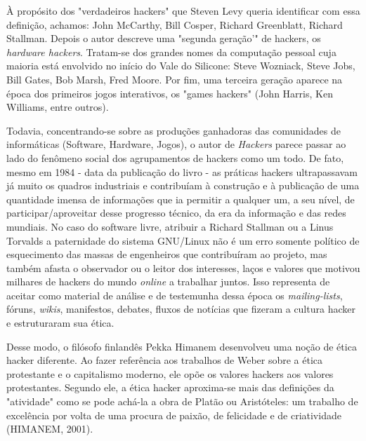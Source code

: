 À propósito dos "verdadeiros hackers" que Steven Levy queria identificar com essa definição, achamos: John McCarthy, Bill Cosper, Richard Greenblatt, Richard Stallman. Depois o autor descreve uma "segunda geração’" de hackers, os \emph{hardware hackers}.  Tratam-se dos grandes nomes da computação pessoal cuja maioria está envolvido no início do Vale do Silicone: Steve Wozniack, Steve Jobs, Bill Gates, Bob Marsh, Fred Moore. Por fim, uma terceira geração aparece na época dos primeiros jogos interativos, os "games hackers" (John Harris, Ken Williams, entre outros).

Todavia, concentrando-se sobre as produções ganhadoras das comunidades de informáticas (Software, Hardware, Jogos), o autor de \emph{Hackers} parece passar ao lado do fenômeno social dos agrupamentos de hackers como um todo. De fato, mesmo em 1984 - data da publicação do livro - as práticas hackers ultrapassavam já muito os quadros industriais e contribuíam à construção e à publicação de uma quantidade imensa de informações que ia permitir a qualquer um, a seu nível, de participar/aproveitar desse progresso técnico, da era da informação e das redes mundiais. No caso do software livre, atribuir a Richard Stallman ou a Linus Torvalds a paternidade do sistema GNU/Linux não é um erro somente político de esquecimento das massas de engenheiros que contribuíram ao projeto, mas também afasta o observador ou o leitor dos interesses, laços e valores que motivou milhares de hackers do mundo \emph{online} a trabalhar juntos. Isso representa de aceitar como material de análise e de testemunha dessa época os \emph{mailing-lists}, fóruns, \emph{wikis}, manifestos, debates, fluxos de notícias que fizeram a cultura hacker e estruturaram sua ética.

Desse modo, o filósofo finlandês Pekka Himanem desenvolveu uma noção de ética hacker diferente. Ao fazer referência aos trabalhos de Weber sobre a ética protestante e o capitalismo moderno, ele opõe os valores hackers aos valores protestantes. Segundo ele, a ética hacker aproxima-se mais das definições da "atividade" como se pode achá-la a obra de Platão ou Aristóteles: um trabalho de excelência por volta de uma procura de paixão, de felicidade e de criatividade (HIMANEM, 2001).

